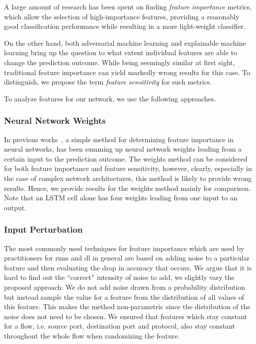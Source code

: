 \documentclass[conference]{IEEEtran}
\begin{document}
A large amount of research has been spent on finding \emph{feature importance} metrics, which allow the selection  of high-importance features, providing a reasonably good classification performance while resulting in a more light-weight classifier.

On the other hand, both adversarial machine learning and explainable machine learning bring up the question to what extent individual features are able to change the prediction outcome. While being seemingly similar at first sight, traditional feature importance can yield markedly wrong results for this case.  To distinguish, we propose the term \emph{feature sensitivity} for such metrics.

To analyze features for our network, we use the following approaches.

\subsubsection{Neural Network Weights}
In previous works~\cite{olden_accurate_2004}, a simple method for determining feature importance in neural networks, has been summing up neural network weights leading from a certain input to the prediction outcome. The weights method can be considered for both feature importance and feature sensitivity, however, clearly, especially in the case of complex network architectures, this method is likely to provide wrong results. Hence, we provide results for the weights method mainly for comparison. Note that an LSTM cell alone has four weights leading from one input to an output. 

\subsubsection{Input Perturbation}

 The most commonly used techniques for feature importance which are used by practitioners for \glspl{rnn} \cite{stackexchange_cross_validated_neural_2019} and \gls{dl} \cite{molnar_interpretable_2019,stackexchange_cross_validated_feature_2016} in general are based on adding noise to a particular feature and then evaluating the drop in accuracy that occurs. We argue that it is hard to find out the ``correct'' intensity of noise to add, we slightly vary the proposed approach: We do not add noise drawn from a probability distribution but instead sample the value for a feature from the distribution of all values of this feature. This makes the method non-parametric since the distribution of the noise does not need to be chosen. We ensured that features which stay constant for a flow, i.e. source port, destination port and protocol, also stay constant throughout the whole flow when randomizing the feature.
\end{document}

